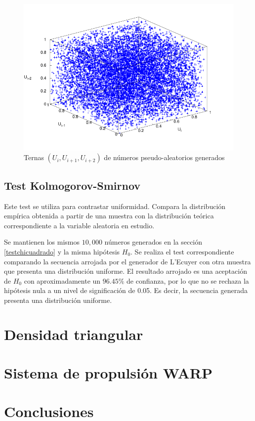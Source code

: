 \documentclass{sig-alternate}
\begin{document}
\begin{figure}[hp]
\centering
\includegraphics[scale=0.8]{graficos/ternas}
\caption{Ternas $(U_{i}, U_{i+1}, U_{i+2})$ de n\'{u}meros pseudo-aleatorios
generados}
\label{fig:ternas}
\end{figure}

\subsection{Test Kolmogorov-Smirnov}\label{testks}

Este test se utiliza para contrastar uniformidad. Compara la distribuci\'{o}n
emp\'{i}rica obtenida a partir de una muestra con la distribuci\'{o}n te\'{o}rica
correspondiente a la variable aleatoria en estudio.

Se mantienen los mismos $10,000$ n\'{u}meros generados en la secci\'{o}n
\ref{testchicuadrado} y la misma hip\'{o}tesis $H_{0}$. Se realiza el test
correspondiente comparando la secuencia arrojada por el generador de L'Ecuyer
con otra muestra que presenta una distribuci\'{o}n uniforme. El resultado
arrojado es una aceptaci\'{o}n de $H_{0}$ con aproximadamente un $96.45\%$
de confianza, por lo que no se rechaza la hip\'{o}tesis nula a un nivel de 
significaci\'{o}n de 0.05. Es decir, la secuencia generada presenta una 
distribuci\'{o}n uniforme.

\section{Densidad triangular}\label{triangular}

\section{Sistema de propulsi\'{o}n WARP}\label{simulacionpropulsor}

\section{Conclusiones}\label{conclusiones}
\end{document}
